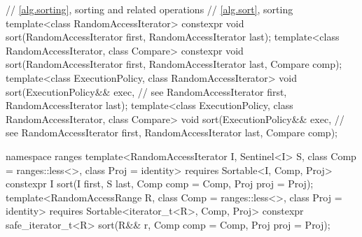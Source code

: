 \begin{codeblock}
  // \ref{alg.sorting}, sorting and related operations
  // \ref{alg.sort}, sorting
  template<class RandomAccessIterator>
    constexpr void sort(RandomAccessIterator first, RandomAccessIterator last);
  template<class RandomAccessIterator, class Compare>
    constexpr void sort(RandomAccessIterator first, RandomAccessIterator last,
              Compare comp);
  template<class ExecutionPolicy, class RandomAccessIterator>
    void sort(ExecutionPolicy&& exec, // see 
              RandomAccessIterator first, RandomAccessIterator last);
  template<class ExecutionPolicy, class RandomAccessIterator, class Compare>
    void sort(ExecutionPolicy&& exec, // see 
              RandomAccessIterator first, RandomAccessIterator last,
              Compare comp);
\end{codeblock}\begin{addedblock}\begin{codeblock}
  namespace ranges {
    template<RandomAccessIterator I, Sentinel<I> S, class Comp = ranges::less<>,
        class Proj = identity>
      requires Sortable<I, Comp, Proj>
      constexpr I
        sort(I first, S last, Comp comp = Comp{}, Proj proj = Proj{});
    template<RandomAccessRange R, class Comp = ranges::less<>, class Proj = identity>
      requires Sortable<iterator_t<R>, Comp, Proj>
      constexpr safe_iterator_t<R>
        sort(R&& r, Comp comp = Comp{}, Proj proj = Proj{});
  }
\end{codeblock}\end{addedblock}\begin{codeblock}


\end{codeblock}
